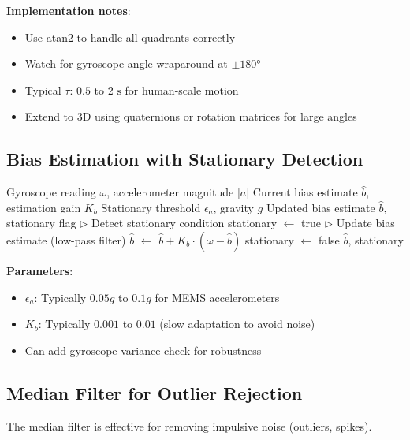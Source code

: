 \textbf{Implementation notes}:
\begin{itemize}
    \item Use atan2 to handle all quadrants correctly
    \item Watch for gyroscope angle wraparound at $\pm 180°$
    \item Typical $\tau$: $0.5$ to $2\text{ s}$ for human-scale motion
    \item Extend to 3D using quaternions or rotation matrices for large angles
\end{itemize}

\subsection{Bias Estimation with Stationary Detection}

\begin{algorithm}[htbp]
\caption{Gyroscope Bias Estimation with Zero-Velocity Update}
\label{alg:bias_estimation}
\begin{algorithmic}
\REQUIRE Gyroscope reading $\omega$, accelerometer magnitude $|a|$
\REQUIRE Current bias estimate $\hat{b}$, estimation gain $K_b$
\REQUIRE Stationary threshold $\epsilon_a$, gravity $g$
\ENSURE Updated bias estimate $\hat{b}$, stationary flag
\STATE $\triangleright$ Detect stationary condition
    \STATE stationary $\leftarrow$ true
    \STATE $\triangleright$ Update bias estimate (low-pass filter)
    \STATE $\hat{b}$ $\leftarrow$ $\hat{b} + K_b \cdot (\omega - \hat{b})$
\ELSE
    \STATE stationary $\leftarrow$ false
\ENDIF
\RETURN $\hat{b}$, stationary
\end{algorithmic}
\end{algorithm}

\textbf{Parameters}:
\begin{itemize}
    \item $\epsilon_a$: Typically $0.05g$ to $0.1g$ for MEMS accelerometers
    \item $K_b$: Typically $0.001$ to $0.01$ (slow adaptation to avoid noise)
    \item Can add gyroscope variance check for robustness
\end{itemize}

\subsection{Median Filter for Outlier Rejection}

The median filter is effective for removing impulsive noise (outliers, spikes).

